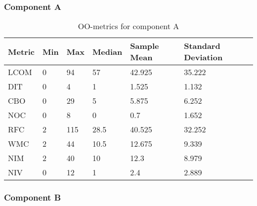 \subsubsection{Component A}
\begin{table}[]
\centering
\caption{OO-metrics for component A}
\label{tab:oometrics-al}
\begin{tabular}{|l|l|l|l|l|l|}
\hline
\textbf{Metric} & \textbf{Min} & \textbf{Max} & \textbf{Median} & \textbf{Sample Mean} & \textbf{Standard Deviation} \\ \hline
LCOM            & 0            & 94           & 57              & 42.925               & 35.222                      \\ \hline
DIT             & 0            & 4            & 1               & 1.525                & 1.132                       \\ \hline
CBO             & 0            & 29           & 5               & 5.875                & 6.252                       \\ \hline
NOC             & 0            & 8            & 0               & 0.7                  & 1.652                       \\ \hline
RFC             & 2            & 115          & 28.5            & 40.525               & 32.252                      \\ \hline
WMC             & 2            & 44           & 10.5            & 12.675               & 9.339                       \\ \hline
NIM             & 2            & 40           & 10              & 12.3                 & 8.979                       \\ \hline
NIV             & 0            & 12           & 1               & 2.4                  & 2.889                       \\ \hline
\end{tabular}
\end{table}














\subsubsection{Component B}

